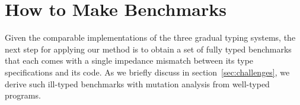 \section{How to Make Benchmarks} \label{sec:mutate}

Given the comparable implementations of the three gradual typing systems,
the next step for applying our method is to obtain a set of fully
typed benchmarks that each comes with a single impedance mismatch between
its type specifications and its code. As we briefly discuss in
section~\ref{sec:challenges}, we derive such ill-typed benchmarks with
mutation analysis from well-typed programs.  

